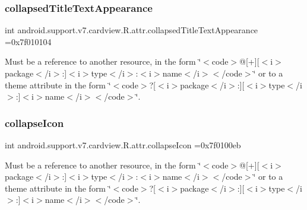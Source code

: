 \subsubsection{\texorpdfstring{collapsed\+Title\+Text\+Appearance}{collapsedTitleTextAppearance}}
{\footnotesize\ttfamily int android.\+support.\+v7.\+cardview.\+R.\+attr.\+collapsed\+Title\+Text\+Appearance =0x7f010104\hspace{0.3cm}{\ttfamily [static]}}

Must be a reference to another resource, in the form \char`\"{}$<$code$>$@\mbox{[}+\mbox{]}\mbox{[}$<$i$>$package$<$/i$>$\+:\mbox{]}$<$i$>$type$<$/i$>$\+:$<$i$>$name$<$/i$>$$<$/code$>$\char`\"{} or to a theme attribute in the form \char`\"{}$<$code$>$?\mbox{[}$<$i$>$package$<$/i$>$\+:\mbox{]}\mbox{[}$<$i$>$type$<$/i$>$\+:\mbox{]}$<$i$>$name$<$/i$>$$<$/code$>$\char`\"{}. \mbox{\label{classandroid_1_1support_1_1v7_1_1cardview_1_1R_1_1attr_a0a8e0f7565352fa08daf97a416c9ceea}} 
\subsubsection{\texorpdfstring{collapse\+Icon}{collapseIcon}}
{\footnotesize\ttfamily int android.\+support.\+v7.\+cardview.\+R.\+attr.\+collapse\+Icon =0x7f0100eb\hspace{0.3cm}{\ttfamily [static]}}

Must be a reference to another resource, in the form \char`\"{}$<$code$>$@\mbox{[}+\mbox{]}\mbox{[}$<$i$>$package$<$/i$>$\+:\mbox{]}$<$i$>$type$<$/i$>$\+:$<$i$>$name$<$/i$>$$<$/code$>$\char`\"{} or to a theme attribute in the form \char`\"{}$<$code$>$?\mbox{[}$<$i$>$package$<$/i$>$\+:\mbox{]}\mbox{[}$<$i$>$type$<$/i$>$\+:\mbox{]}$<$i$>$name$<$/i$>$$<$/code$>$\char`\"{}. \mbox{\label{classandroid_1_1support_1_1v7_1_1cardview_1_1R_1_1attr_a31fd3a6826f001af0482762741e11b2c}} 
